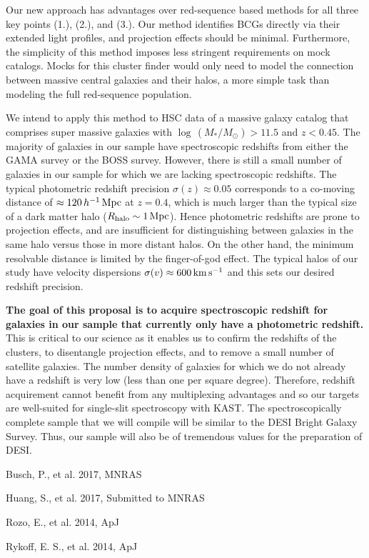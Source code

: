 \documentclass[letterpaper,12pt]{article}
\newenvironment{my_itemize}{
\begin{itemize}
  \setlength{\itemsep}{1pt}
  \setlength{\parskip}{0pt}
  \setlength{\parsep}{0pt}}{\end{itemize}
}
\begin{document}
Our new approach has advantages over red-sequence based methods for all three key points (1.), (2.), and (3.). Our
method identifies BCGs directly via their extended light profiles, and projection effects should be minimal.
Furthermore, the simplicity of this method imposes less stringent requirements on mock catalogs. Mocks for this cluster
finder would only need to model the connection between massive central galaxies and their halos, a more simple task
than modeling the full red-sequence population.

We intend to apply this method to HSC data of a massive galaxy catalog that comprises super massive galaxies with
$\log\,(M_*/M_\odot)>11.5$ and $z<0.45$. The majority of galaxies in our sample have spectroscopic redshifts from
either the GAMA survey or the BOSS survey. However, there is still a small number of galaxies in our sample for which
we are lacking spectroscopic redshifts. The typical photometric redshift precision $\sigma(z)\approx0.05$ corresponds
to a co-moving distance of $\approx120\,h^{-1}\,{\rm Mpc}$ at $z=0.4$, which is much larger than the typical size of a
dark matter halo ($R_{\rm halo}\sim1\,{\rm Mpc}$). Hence photometric redshifts are prone to projection effects, and are 
insufficient
for distinguishing between galaxies in the same halo versus those in more distant halos. On the other hand, the
minimum resolvable distance is limited by the finger-of-god effect. The typical halos of our study have velocity
dispersions $\sigma(v)\approx600\,{\rm km\,s^{-1}}$ and this sets our desired redshift precision.

\textbf{The goal of this proposal is to acquire spectroscopic redshift for galaxies in
our sample that currently only have a photometric redshift.} This is critical to our science as it enables
us to confirm the redshifts of the clusters, to disentangle projection effects, and to remove a small number of
satellite galaxies. The number density of galaxies for which we do not already have a redshift is very low (less than
one per square degree). Therefore, redshift acquirement cannot benefit from any multiplexing advantages and so our
targets are well-suited for single-slit spectroscopy with KAST. The spectroscopically complete sample that we will
compile will be similar to the DESI Bright Galaxy Survey. Thus, our sample will also be of tremendous values for the
preparation of DESI.

\clearpage

\vspace{-0.25in}
\begin{my_itemize}
\item Busch, P., et al. 2017, MNRAS
\item Huang, S., et al. 2017, Submitted to MNRAS
\item Rozo, E., et al. 2014, ApJ
\item Rykoff, E. S., et al. 2014, ApJ
\end{my_itemize}
\end{document}
